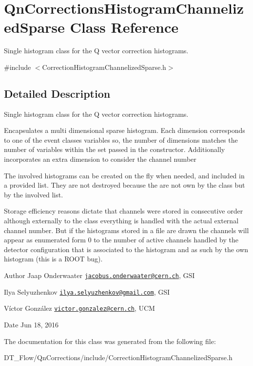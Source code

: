 \hypertarget{classQnCorrectionsHistogramChannelizedSparse}{}\section{Qn\+Corrections\+Histogram\+Channelized\+Sparse Class Reference}
\label{classQnCorrectionsHistogramChannelizedSparse}


Single histogram class for the Q vector correction histograms.  




{\ttfamily \#include $<$Correction\+Histogram\+Channelized\+Sparse.\+h$>$}



\subsection{Detailed Description}
Single histogram class for the Q vector correction histograms. 

Encapsulates a multi dimensional sparse histogram. Each dimension corresponds to one of the event classes variables so, the number of dimensions matches the number of variables within the set passed in the constructor. Additionally incorporates an extra dimension to consider the channel number

The involved histograms can be created on the fly when needed, and included in a provided list. They are not destroyed because the are not own by the class but by the involved list.

Storage efficiency reasons dictate that channels were stored in consecutive order although externally to the class everything is handled with the actual external channel number. But if the histograms stored in a file are drawn the channels will appear as enumerated form 0 to the number of active channels handled by the detector configuration that is associated to the histogram and as such by the own histogram (this is a R\+O\+OT bug).

\begin{DoxyAuthor}{Author}
Jaap Onderwaater \href{mailto:jacobus.onderwaater@cern.ch}{\tt jacobus.\+onderwaater@cern.\+ch}, G\+SI 

Ilya Selyuzhenkov \href{mailto:ilya.selyuzhenkov@gmail.com}{\tt ilya.\+selyuzhenkov@gmail.\+com}, G\+SI 

Víctor González \href{mailto:victor.gonzalez@cern.ch}{\tt victor.\+gonzalez@cern.\+ch}, U\+CM 
\end{DoxyAuthor}
\begin{DoxyDate}{Date}
Jun 18, 2016 
\end{DoxyDate}


The documentation for this class was generated from the following file\+:\begin{DoxyCompactItemize}
\item 
D\+T\+\_\+\+Flow/\+Qn\+Corrections/include/Correction\+Histogram\+Channelized\+Sparse.\+h\end{DoxyCompactItemize}
